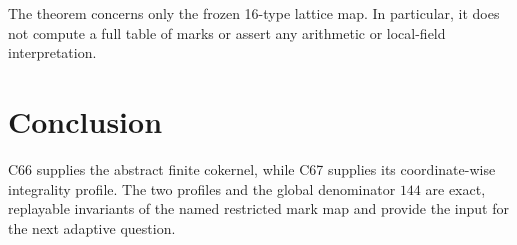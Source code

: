 \documentclass[10pt]{article}
\begin{document}
The theorem concerns only the frozen 16-type lattice map.  In particular, it
does not compute a full table of marks or assert any arithmetic or
local-field interpretation.

\section{Conclusion}
C66 supplies the abstract finite cokernel, while C67 supplies its
coordinate-wise integrality profile.  The two profiles and the global
denominator $144$ are exact, replayable invariants of the named restricted
mark map and provide the input for the next adaptive question.
\end{document}
